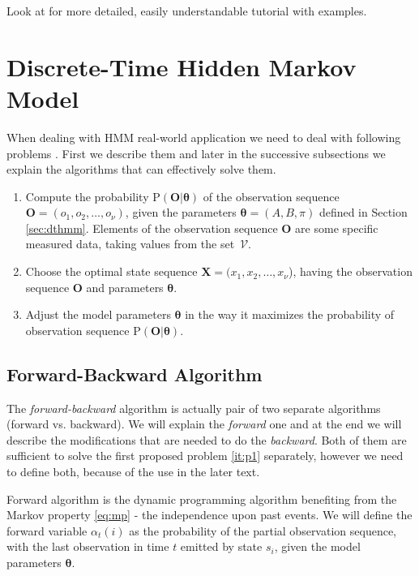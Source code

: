 \documentclass[thesis=M,english]{FITthesis}[2012/10/20]
\newcommand{\matr}[1]{\mathbf{#1}}
\begin{document}
Look at \cite{Do08} for more detailed, easily understandable tutorial with examples.

\section{Discrete-Time Hidden Markov Model}\label{sec:3p}
When dealing with HMM real-world application we need to deal with following problems \cite{Ra89}. First we describe them and later in the successive subsections we explain the algorithms that can effectively solve them. 

\begin{enumerate}
\item Compute the probability $\mathrm{P}(\matr{O}|\matr{\theta}) $ of the observation sequence \\ $\matr{O} = (o_1,o_2,\dots,o_{\nu})$, given the parameters $\matr{\theta} = (A,B,\pi)$ defined in  Section \ref{sec:dthmm}. Elements of the observation sequence $\matr{O}$ are some specific measured data, taking values from the set~$\mathcal{V}$. \label{it:p1}  
\item Choose the optimal state sequence $\matr{X} = (x_1,x_2,\dots,x_{\nu}$), having the observation sequence $\matr{O}$ and parameters $\matr{\theta}$. \label{it:p2} 
\item Adjust the model parameters $\matr{\theta}$ in the way it maximizes the probability of observation sequence $ \mathrm{P}(\matr{O}|\matr{\theta}) $. \label{it:p3} 
\end{enumerate}


\subsection{Forward-Backward Algorithm}\label{sec:fb}
The \textit{forward-backward} algorithm is actually pair of two separate algorithms (forward vs. backward). We will explain the \textit{forward} one and at the end we will describe the modifications that are needed to do the \textit{backward}. Both of them are sufficient to solve the first proposed problem \ref{it:p1} separately, however we need to define both, because of the use in the later text.  

Forward algorithm is the dynamic programming algorithm benefiting from the Markov property \eqref{eq:mp} - the independence upon past events. We will define the forward variable $\alpha_t(i)$ as the probability of the partial observation sequence, with the last observation in time $t$ emitted by state $s_i$, given the model parameters $\matr{\theta}$.
\end{document}
